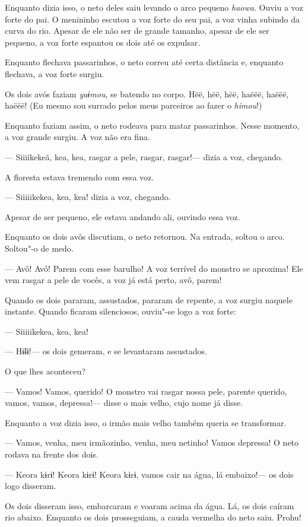 Enquanto dizia isso, o neto deles saiu levando o arco pequeno \emph{haowa}.
Ouviu a voz forte do pai. O menininho escutou a voz forte do seu pai, a
voz vinha subindo da curva do rio. Apesar de ele não ser de grande
tamanho, apesar de ele ser pequeno, a voz forte espantou os dois até os
expulsar. 

Enquanto flechava passarinhos, o neto correu até certa distância e,
enquanto flechava, a voz forte surgiu. 

Os dois avós faziam \emph{yaɨmou}, se batendo no
corpo. Hëë, hëë, hëë, haëëë, haëëë, haëëë! (Eu mesmo sou surrado
pelos meus parceiros ao fazer o \emph{himou}!) 

Enquanto faziam assim, o neto rodeava para matar passarinhos. Nesse
momento, a voz grande surgiu. A voz não era fina. 

--- Siiiikekeã, kea, kea, rasgar a pele, rasgar, rasgar!--- dizia
a voz, chegando. 

A floresta estava tremendo com essa voz. 

--- Siiiiikekea, kea, kea! dizia a voz, chegando. 

Apesar de ser pequeno, ele estava andando ali, ouvindo essa voz. 

Enquanto os dois avôs discutiam, o neto retornou. Na entrada, soltou o
arco. Soltou"-o de medo. 

--- Avô! Avô! Parem com esse barulho! A voz terrível do monstro se
aproxima! Ele vem rasgar a pele de vocês, a voz já está perto, avô,
parem! 

Quando os dois pararam, assustados, pararam de repente, a voz surgiu
naquele instante. Quando ficaram silenciosos, ouviu"-se logo a voz
forte: 

--- Siiiiikekea, kea, kea! 

--- Hɨ̃ɨɨ!--- os dois gemeram, e se levantaram assustados. 

O que lhes aconteceu?

--- Vamos! Vamos, querido! O monstro vai rasgar nossa pele, parente
querido, vamos, vamos, depressa!--- disse o mais velho, cujo nome já
disse. 

Enquanto a voz dizia isso, o irmão mais velho também queria se
transformar. 

--- Vamos, venha, meu irmãozinho, venha, meu netinho! Vamos depressa! O
neto rodava na frente dos dois. 

--- Keora kɨrɨ! Keora kɨrɨ! Keora kɨrɨ, vamos cair na água, lá
embaixo!--- os dois logo disseram. 

Os dois disseram isso, embarcaram e voaram acima da água. Lá, os dois
caíram rio abaixo. Enquanto os dois prosseguiam, a cauda vermelha do
neto saiu. Prohu! 

